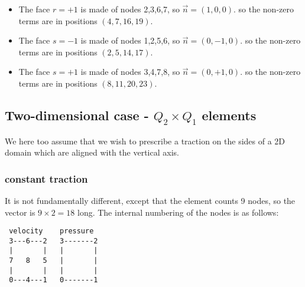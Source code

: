 \begin{itemize}
{\[\begin{array}{c}
0\\
0\\
0\\
0\\
0\\
0\\
0\\
1\\
0\\
0\\
1\\
0\\
0\\
0\\
0\\
0\\
0\\
0\\
0\\
1\\
0\\
0
\end{array}
\right)
\]
}


\item
The face $r=+1$ is made of nodes 2,3,6,7, so $\vec{n}=(1,0,0)$.
so the non-zero terms are in positions $(4,7,16,19)$.

\item
The face $s=-1$ is made of nodes 1,2,5,6, so $\vec{n}=(0,-1,0)$.
so the non-zero terms are in positions $(2,5,14,17)$.

\item
The face $s=+1$ is made of nodes 3,4,7,8, so $\vec{n}=(0,+1,0)$.
so the non-zero terms are in positions $(8,11,20,23)$.

\end{itemize}


\subsection{Two-dimensional case - $Q_2 \times Q_1$ elements}

We here too assume that we wish to prescribe a traction on the sides of a 2D domain
which are aligned with the vertical axis.

\subsubsection{constant traction}

It is not fundamentally different, except that the element counts 9 nodes, 
so the vector is $9\times 2=18$ long. 
The internal numbering of the nodes is as follows:
\begin{verbatim}
 velocity    pressure
 3---6---2   3-------2
 |       |   |       |
 7   8   5   |       |
 |       |   |       |
 0---4---1   0-------1
\end{verbatim}

